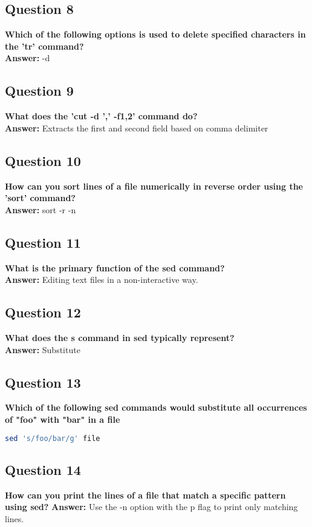 \documentclass[11pt,parskip]{scrartcl}
\begin{document}
\subsection*{Question 8} 
\textbf{Which of the following options is used to delete specified characters in the 'tr' command?} \\
\textbf{Answer:} -d

\subsection*{Question 9} 
\textbf{What does the 'cut -d ',' -f1,2' command do?} \\
\textbf{Answer:} Extracts the first and second field based on comma delimiter

\subsection*{Question 10} 
\textbf{How can you sort lines of a file numerically in reverse order using the 'sort' command?} \\
\textbf{Answer:} sort -r -n

\subsection*{Question 11}
\textbf{What is the primary function of the sed command?} \\
\textbf{Answer:} Editing text files in a non-interactive way.

\subsection*{Question 12}
\textbf{What does the s command in sed typically represent?} \\
\textbf{Answer:} Substitute

\subsection*{Question 13}
\textbf{Which of the following sed commands would substitute all occurrences of "foo" with "bar" in a file}
\begin{lstlisting}[language=bash]
sed 's/foo/bar/g' file
\end{lstlisting}

\subsection*{Question 14} 
\textbf{How can you print the lines of a file that match a specific pattern using sed?}
\textbf{Answer:} Use the -n option with the p flag to print only matching lines.
\end{document}
